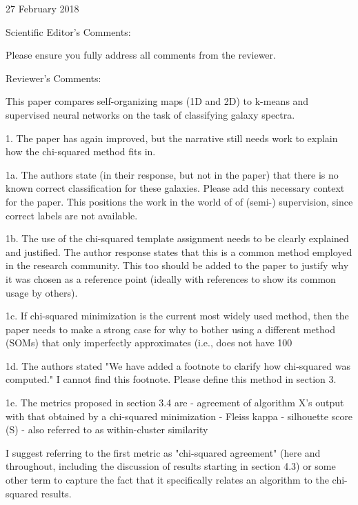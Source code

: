 27 February 2018

Scientific Editor's Comments:

Please ensure you fully address all comments from the reviewer.



Reviewer's Comments:

This paper compares self-organizing maps (1D and 2D) to k-means and supervised neural networks on the task of classifying galaxy spectra.

1. The paper has again improved, but the narrative still needs work to explain how the chi-squared method fits in.

1a. The authors state (in their response, but not in the paper) that there is no known correct classification for these galaxies.  Please add this necessary context for the paper.  This positions the work in the world of of (semi-) supervision, since correct labels are not available.

1b. The use of the chi-squared template assignment needs to be clearly explained and justified.  The author response states that this is a common method employed in the research community.  This too should be added to the paper to justify why it was chosen as a reference point (ideally with references to show its common usage by others).

1c. If chi-squared minimization is the current most widely used method, then the paper needs to make a strong case for why to bother using a different method (SOMs) that only imperfectly approximates (i.e., does not have 100%

1d. The authors stated "We have added a footnote to clarify how chi-squared was computed."  I cannot find this footnote.  Please define this method in section 3.

1e. The metrics proposed in section 3.4 are
- agreement of algorithm X's output with that obtained by a chi-squared minimization
- Fleiss kappa
- silhouette score (S) - also referred to as within-cluster similarity

I suggest referring to the first metric as "chi-squared agreement" (here and throughout, including the discussion of results starting in section 4.3) or some other term to capture the fact that it specifically relates an algorithm to the chi-squared results.

